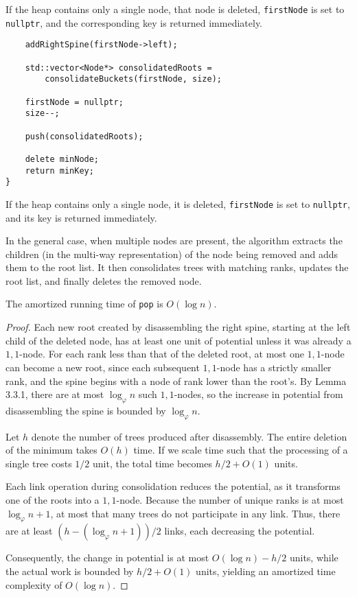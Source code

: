 If the heap contains only a single node, that node is deleted, \texttt{firstNode} is set to \texttt{nullptr}, and the corresponding key is returned immediately.

\begin{verbatim}
    addRightSpine(firstNode->left);
        
    std::vector<Node*> consolidatedRoots = 
        consolidateBuckets(firstNode, size);

    firstNode = nullptr;
    size--;

    push(consolidatedRoots);

    delete minNode;
    return minKey;
}
\end{verbatim}

If the heap contains only a single node, it is deleted, \texttt{firstNode} is set to \texttt{nullptr}, and its key is returned immediately.

In the general case, when multiple nodes are present, the algorithm extracts the children (in the multi-way representation) of the node being removed and adds them to the root list. It then consolidates trees with matching ranks, updates the root list, and finally deletes the removed node.

\begin{lemma}
The amortized running time of \texttt{pop} is \(O(\log n)\).
\end{lemma}

\begin{proof}
Each new root created by disassembling the right spine, starting at the left child of the deleted node, has at least one unit of potential unless it was already a \(1,1\)-node. For each rank less than that of the deleted root, at most one \(1,1\)-node can become a new root, since each subsequent \(1,1\)-node has a strictly smaller rank, and the spine begins with a node of rank lower than the root’s. By Lemma 3.3.1, there are at most \(\log_\varphi n\) such \(1,1\)-nodes, so the increase in potential from disassembling the spine is bounded by \(\log_\varphi n\).

Let \(h\) denote the number of trees produced after disassembly. The entire deletion of the minimum takes \(O(h)\) time. If we scale time such that the processing of a single tree costs \(1/2\) unit, the total time becomes \(h/2 + O(1)\) units.

Each link operation during consolidation reduces the potential, as it transforms one of the roots into a \(1,1\)-node. Because the number of unique ranks is at most \(\log_\varphi n + 1\), at most that many trees do not participate in any link. Thus, there are at least \((h - (\log_\varphi n + 1))/2\) links, each decreasing the potential.

Consequently, the change in potential is at most \(O(\log n) - h/2\) units, while the actual work is bounded by \(h/2 + O(1)\) units, yielding an amortized time complexity of \(O(\log n)\).
\end{proof}

